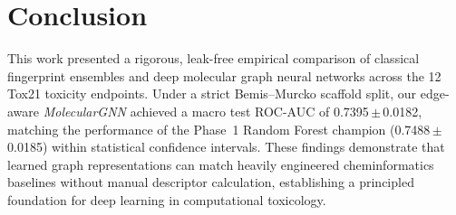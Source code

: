 \documentclass[conference]{IEEEtran}
\newcommand{\pmsem}[2]{#1\,$\pm$\,#2}
\begin{document}
\section{Conclusion}
This work presented a rigorous, leak-free empirical comparison of classical fingerprint ensembles and deep molecular graph neural networks across the 12 Tox21 toxicity endpoints. Under a strict Bemis--Murcko scaffold split, our edge-aware \textit{MolecularGNN} achieved a macro test ROC-AUC of \pmsem{0.7395}{0.0182}, matching the performance of the Phase~1 Random Forest champion (\pmsem{0.7488}{0.0185}) within statistical confidence intervals. These findings demonstrate that learned graph representations can match heavily engineered cheminformatics baselines without manual descriptor calculation, establishing a principled foundation for deep learning in computational toxicology.



\end{document}
